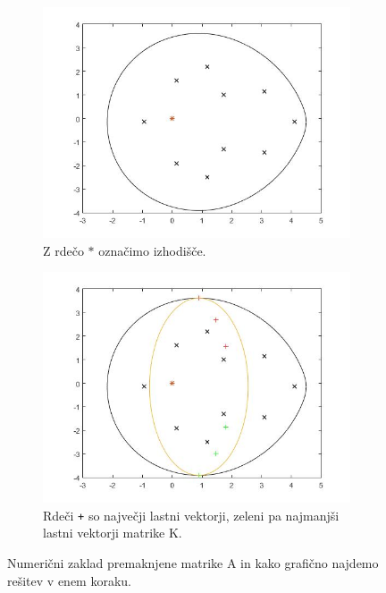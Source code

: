 \documentclass[12pt,a4paper]{amsart}
\theoremstyle{definition}
\theoremstyle{plain}
\begin{document}
\begin{figure}[H]
\renewcommand*\thesubfigure{\Alph{subfigure}}
\begin{subfigure}[t]{0.5\textwidth}
\includegraphics[width=0.9\linewidth]{RC1.jpg}
\caption{Z rdečo $\ast$ označimo izhodišče.}
\label{fig:p31}
\end{subfigure}%
\hfill
\begin{subfigure}[t]{0.5\textwidth}
\includegraphics[width=0.9\linewidth]{RC1e.jpg}
\caption{Rdeči \verb~+~ so največji lastni vektorji, zeleni pa najmanjši lastni vektorji matrike K.\footnotemark}
\end{subfigure}
\caption{Numerični zaklad premaknjene matrike A in kako grafično najdemo rešitev v enem koraku.}

\end{figure}

\end{document}
